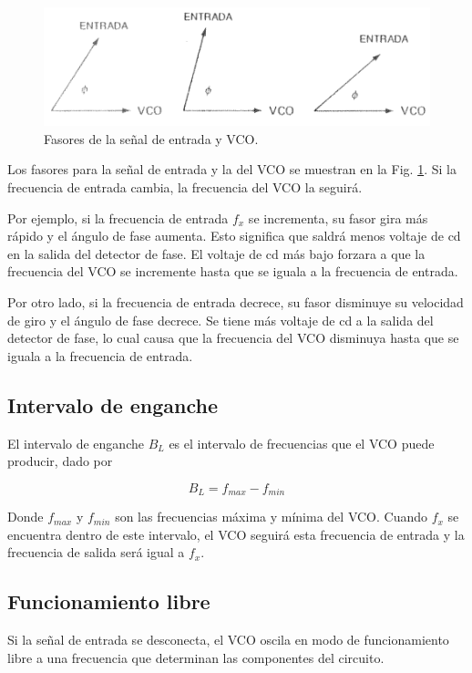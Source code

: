 \documentclass[10pt,a4paper]{IEEEtran}
\begin{document}
    \begin{figure}[H]
        \centering
        \includegraphics[scale=0.3]{pll2.png}
        \caption{Fasores de la señal de entrada y VCO.}
        \label{pll2}
    \end{figure}
    
    Los fasores para la señal de entrada y la del VCO se muestran en la Fig. \ref{pll2}. Si la frecuencia de entrada cambia, la frecuencia del VCO la seguirá. 
    
    Por ejemplo, si la frecuencia de entrada $f_x$ se incrementa, su fasor gira más rápido y el ángulo de fase aumenta. Esto significa que saldrá menos voltaje de cd en la salida del detector de fase. El voltaje de cd más bajo forzara a que la frecuencia del VCO se incremente hasta que se iguala a la frecuencia de entrada.
    
    Por otro lado, si la frecuencia de entrada decrece, su fasor disminuye su velocidad de giro y el ángulo de fase decrece. Se tiene más voltaje de cd a la salida del detector de fase, lo cual causa que la frecuencia del VCO disminuya hasta que se iguala a la frecuencia de entrada.
    
    \subsection{Intervalo de enganche}
    El intervalo de enganche $B_L$ es el intervalo de frecuencias que el VCO puede producir, dado por 
    
    \begin{equation}\label{bl}
    B_L = f_{max}-f_{min} 
    \end{equation}
    
    Donde $f_{max}$ y $f_{min}$ son las frecuencias máxima y mínima del VCO.
    Cuando $f_x$ se encuentra dentro de este intervalo, el VCO seguirá esta frecuencia de entrada y la frecuencia de salida será igual a $f_x$.
    
    \subsection{Funcionamiento libre}
    Si la señal de entrada se desconecta, el VCO oscila en modo de funcionamiento libre a una frecuencia que determinan las componentes del circuito. 
    
\end{document}
